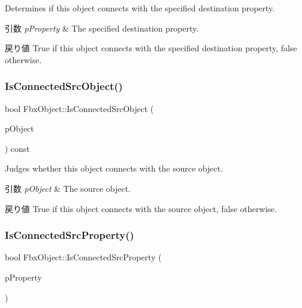 Determines if this object connects with the specified destination property. 
\begin{DoxyParams}{引数}
{\em p\+Property} & The specified destination property. \\
\hline
\end{DoxyParams}
\begin{DoxyReturn}{戻り値}
{\ttfamily True} if this object connects with the specified destination property, {\ttfamily false} otherwise. 
\end{DoxyReturn}
\mbox{\label{class_fbx_object_a2ff6d4507136a693622a7d8434b440ed}} 
\subsubsection{\texorpdfstring{Is\+Connected\+Src\+Object()}{IsConnectedSrcObject()}}
{\footnotesize\ttfamily bool Fbx\+Object\+::\+Is\+Connected\+Src\+Object (\begin{DoxyParamCaption}\item[{const \hyperlink{class_fbx_object}{Fbx\+Object} $\ast$}]{p\+Object }\end{DoxyParamCaption}) const}

Judges whether this object connects with the source object. 
\begin{DoxyParams}{引数}
{\em p\+Object} & The source object. \\
\hline
\end{DoxyParams}
\begin{DoxyReturn}{戻り値}
{\ttfamily True} if this object connects with the source object, {\ttfamily false} otherwise. 
\end{DoxyReturn}
\mbox{\label{class_fbx_object_a7f2c8c668ac8e009584c12f19809be22}} 
\subsubsection{\texorpdfstring{Is\+Connected\+Src\+Property()}{IsConnectedSrcProperty()}}
{\footnotesize\ttfamily bool Fbx\+Object\+::\+Is\+Connected\+Src\+Property (\begin{DoxyParamCaption}\item[{const \hyperlink{class_fbx_property}{Fbx\+Property} \&}]{p\+Property }\end{DoxyParamCaption})}

